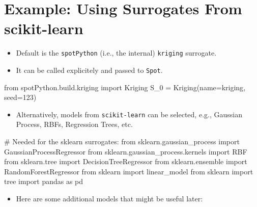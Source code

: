 \documentclass[
  letterpaper,
  DIV=11,
  numbers=noendperiod]{scrreprt}
\newenvironment{Shaded}{\begin{snugshade}}{\end{snugshade}}
\newcommand{\CommentTok}[1]{\textcolor[rgb]{0.37,0.37,0.37}{#1}}
\newcommand{\DecValTok}[1]{\textcolor[rgb]{0.68,0.00,0.00}{#1}}
\newcommand{\ImportTok}[1]{\textcolor[rgb]{0.00,0.46,0.62}{#1}}
\newcommand{\NormalTok}[1]{\textcolor[rgb]{0.00,0.23,0.31}{#1}}
\newcommand{\OperatorTok}[1]{\textcolor[rgb]{0.37,0.37,0.37}{#1}}
\newcommand{\StringTok}[1]{\textcolor[rgb]{0.13,0.47,0.30}{#1}}
\providecommand{\tightlist}{%
  \setlength{\itemsep}{0pt}\setlength{\parskip}{0pt}}\usepackage{longtable,booktabs,array}
\begin{document}
\section{Example: Using Surrogates From
scikit-learn}\label{example-using-surrogates-from-scikit-learn}

\begin{itemize}
\tightlist
\item
  Default is the \texttt{spotPython} (i.e., the internal)
  \texttt{kriging} surrogate.
\item
  It can be called explicitely and passed to \texttt{Spot}.
\end{itemize}

\begin{Shaded}
\begin{Highlighting}[]
\ImportTok{from}\NormalTok{ spotPython.build.kriging }\ImportTok{import}\NormalTok{ Kriging}
\NormalTok{S\_0 }\OperatorTok{=}\NormalTok{ Kriging(name}\OperatorTok{=}\StringTok{\textquotesingle{}kriging\textquotesingle{}}\NormalTok{, seed}\OperatorTok{=}\DecValTok{123}\NormalTok{)}
\end{Highlighting}
\end{Shaded}

\begin{itemize}
\tightlist
\item
  Alternatively, models from \texttt{scikit-learn} can be selected,
  e.g., Gaussian Process, RBFs, Regression Trees, etc.
\end{itemize}

\begin{Shaded}
\begin{Highlighting}[]
\CommentTok{\# Needed for the sklearn surrogates:}
\ImportTok{from}\NormalTok{ sklearn.gaussian\_process }\ImportTok{import}\NormalTok{ GaussianProcessRegressor}
\ImportTok{from}\NormalTok{ sklearn.gaussian\_process.kernels }\ImportTok{import}\NormalTok{ RBF}
\ImportTok{from}\NormalTok{ sklearn.tree }\ImportTok{import}\NormalTok{ DecisionTreeRegressor}
\ImportTok{from}\NormalTok{ sklearn.ensemble }\ImportTok{import}\NormalTok{ RandomForestRegressor}
\ImportTok{from}\NormalTok{ sklearn }\ImportTok{import}\NormalTok{ linear\_model}
\ImportTok{from}\NormalTok{ sklearn }\ImportTok{import}\NormalTok{ tree}
\ImportTok{import}\NormalTok{ pandas }\ImportTok{as}\NormalTok{ pd}
\end{Highlighting}
\end{Shaded}

\begin{itemize}
\tightlist
\item
  Here are some additional models that might be useful later:
\end{itemize}
\end{document}
